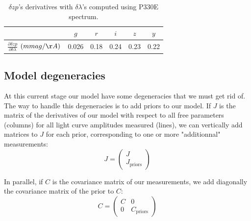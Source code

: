 \documentclass[\docopts]{\docclass}
\begin{document}
\begin{table}[t]
\begin{center}
\caption{$\delta zp$'s derivatives with $\delta\lambda$'s computed using P330E spectrum.}
\label{tab::calib_derivatives}
\begin{tabular}{l|ccccc}
\hline
\hline
  & $g$ & $r$ & $i$ & $z$ & $y$ \\
\hline 
  $\frac{\partial\delta zp}{\partial\delta \lambda}$ $(mmag/\AA)$& 0.026 & 0.18 & 0.24 & 0.23 & 0.22\\
\hline
\end{tabular}
\end{center}
\end{table}


\subsection{Model degeneracies}
\label{sec::model_deg}

At this current stage our model have some degeneracies that we must get rid of.
The way to handle this degeneracies is to add priors to our model.
If $J$ is the matrix of the derivatives  of our model with respect to all free parameters (columns) for all light curve amplitudes measured (lines), we can vertically add matrices to $J$ for each prior, corresponding to one or more "additionnal" measurements:
\begin{equation}
J =
\begin{pmatrix}
  J \\
  J_\text{priors}
\end{pmatrix} 
\end{equation}

In parallel, if $C$ is the covariance matrix of our measurements, we add diagonally the covariance matrix of the prior to $C$:
\begin{equation}
C =
\begin{pmatrix}
  C & 0 \\
  0 & C_\text{priors}
\end{pmatrix} 
\end{equation}
\end{document}

